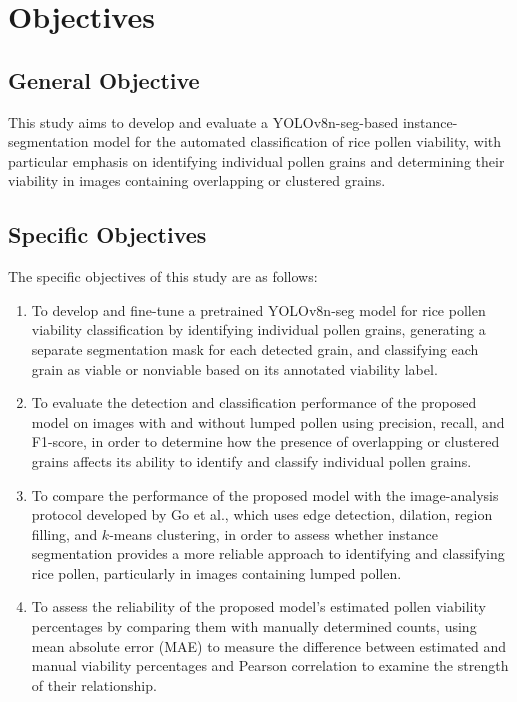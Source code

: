 
\newpage
\section{Objectives}
\label{ch:objectives}

\subsection{General Objective}

This study aims to develop and evaluate a YOLOv8n-seg-based instance-segmentation model for the automated classification of rice pollen viability, with particular emphasis on identifying individual pollen grains and determining their viability in images containing overlapping or clustered grains.

\subsection{Specific Objectives}

The specific objectives of this study are as follows:

\begin{enumerate}
    \item To develop and fine-tune a pretrained YOLOv8n-seg model for rice pollen viability classification by identifying individual pollen grains, generating a separate segmentation mask for each detected grain, and classifying each grain as viable or nonviable based on its annotated viability label.

    \item To evaluate the detection and classification performance of the proposed model on images with and without lumped pollen using precision, recall, and F1-score, in order to determine how the presence of overlapping or clustered grains affects its ability to identify and classify individual pollen grains.

    \item To compare the performance of the proposed model with the image-analysis protocol developed by Go et al., which uses edge detection, dilation, region filling, and $k$-means clustering, in order to assess whether instance segmentation provides a more reliable approach to identifying and classifying rice pollen, particularly in images containing lumped pollen.

    \item To assess the reliability of the proposed model's estimated pollen viability percentages by comparing them with manually determined counts, using mean absolute error (MAE) to measure the difference between estimated and manual viability percentages and Pearson correlation to examine the strength of their relationship.
\end{enumerate}
